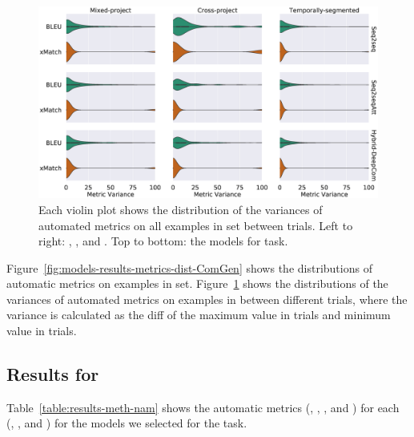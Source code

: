 \begin{figure}[t]
  \centering
  \includegraphics[width=\columnwidth]{figs/models-results-variance-dist-ComGen.eps}
  \caption{Each violin plot shows the distribution of the variances of
    automated metrics on all examples in \test set between \NumTrial
    trials.  Left to right: \mixedproj, \crossproj, and \evoaware
    \methodologies.  Top to bottom: the models for \comgen
    task. \label{fig:models-results-variance-dist-ComGen}}
\end{figure}

Figure~\ref{fig:models-results-metrics-dist-ComGen} shows the
distributions of automatic metrics on examples in \test set.
Figure~\ref{fig:models-results-variance-dist-ComGen} shows the
distributions of the variances of automated metrics on examples in
\test between \NumTrial different trials, where the variance is
calculated as the diff of the maximum value in \NumTrial trials and
minimum value in \NumTrial trials.


\subsection{Results for \MethNam}
\label{sec:eval:results-methnam}



Table~\ref{table:results-meth-nam} shows the automatic metrics (\fone,
\precision, \recall, and \xmatch) for each \methodology (\mixedproj,
\crossproj, and \evoaware) for the models we selected for the \methnam
task.

